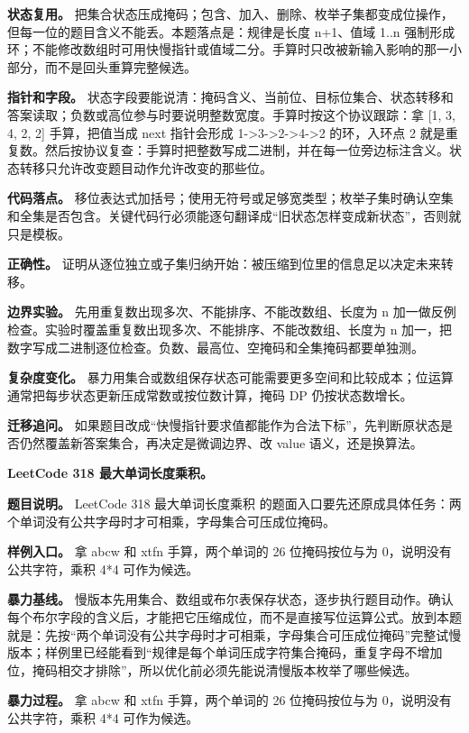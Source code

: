 \textbf{状态复用。} 把集合状态压成掩码；包含、加入、删除、枚举子集都变成位操作，但每一位的题目含义不能丢。本题落点是：规律是长度 n+1、值域 1..n 强制形成环；不能修改数组时可用快慢指针或值域二分。手算时只改被新输入影响的那一小部分，而不是回头重算完整候选。

\textbf{指针和字段。} 状态字段要能说清：掩码含义、当前位、目标位集合、状态转移和答案读取；负数或高位参与时要说明整数宽度。手算时按这个协议跟踪：拿 [1, 3, 4, 2, 2] 手算，把值当成 next 指针会形成 1->3->2->4->2 的环，入环点 2 就是重复数。然后按协议复查：手算时把整数写成二进制，并在每一位旁边标注含义。状态转移只允许改变题目动作允许改变的那些位。

\textbf{代码落点。} 移位表达式加括号；使用无符号或足够宽类型；枚举子集时确认空集和全集是否包含。关键代码行必须能逐句翻译成“旧状态怎样变成新状态”，否则就只是模板。

\textbf{正确性。} 证明从逐位独立或子集归纳开始：被压缩到位里的信息足以决定未来转移。

\textbf{边界实验。} 先用重复数出现多次、不能排序、不能改数组、长度为 n 加一做反例检查。实验时覆盖重复数出现多次、不能排序、不能改数组、长度为 n 加一，把数字写成二进制逐位检查。负数、最高位、空掩码和全集掩码都要单独测。

\textbf{复杂度变化。} 暴力用集合或数组保存状态可能需要更多空间和比较成本；位运算通常把每步状态更新压成常数或按位数计算，掩码 DP 仍按状态数增长。

\textbf{迁移追问。} 如果题目改成“快慢指针要求值都能作为合法下标”，先判断原状态是否仍然覆盖新答案集合，再决定是微调边界、改 value 语义，还是换算法。

\noindent\textbf{LeetCode 318 最大单词长度乘积。}

\textbf{题目说明。} LeetCode 318 最大单词长度乘积 的题面入口要先还原成具体任务：两个单词没有公共字母时才可相乘，字母集合可压成位掩码。

\textbf{样例入口。} 拿 abcw 和 xtfn 手算，两个单词的 26 位掩码按位与为 0，说明没有公共字符，乘积 4*4 可作为候选。

\textbf{暴力基线。} 慢版本先用集合、数组或布尔表保存状态，逐步执行题目动作。确认每个布尔字段的含义后，才能把它压缩成位，而不是直接写位运算公式。放到本题就是：先按“两个单词没有公共字母时才可相乘，字母集合可压成位掩码”完整试慢版本；样例里已经能看到“规律是每个单词压成字符集合掩码，重复字母不增加位，掩码相交才排除”，所以优化前必须先能说清慢版本枚举了哪些候选。

\textbf{暴力过程。} 拿 abcw 和 xtfn 手算，两个单词的 26 位掩码按位与为 0，说明没有公共字符，乘积 4*4 可作为候选。

